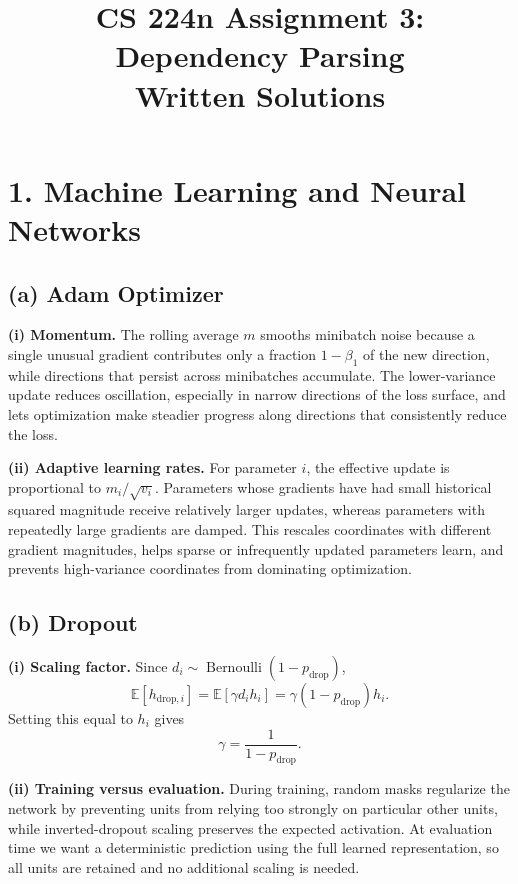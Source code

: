 \documentclass[11pt]{article}
\title{CS 224n Assignment 3: Dependency Parsing\\Written Solutions}
\author{}
\date{}
\begin{document}
\maketitle

\section*{1. Machine Learning and Neural Networks}

\subsection*{(a) Adam Optimizer}

\textbf{(i) Momentum.}
The rolling average $m$ smooths minibatch noise because a single unusual gradient contributes only a fraction $1-\beta_1$ of the new direction, while directions that persist across minibatches accumulate. The lower-variance update reduces oscillation, especially in narrow directions of the loss surface, and lets optimization make steadier progress along directions that consistently reduce the loss.

\textbf{(ii) Adaptive learning rates.}
For parameter $i$, the effective update is proportional to $m_i/\sqrt{v_i}$. Parameters whose gradients have had small historical squared magnitude receive relatively larger updates, whereas parameters with repeatedly large gradients are damped. This rescales coordinates with different gradient magnitudes, helps sparse or infrequently updated parameters learn, and prevents high-variance coordinates from dominating optimization.

\subsection*{(b) Dropout}

\textbf{(i) Scaling factor.}
Since $d_i\sim\operatorname{Bernoulli}(1-p_{\mathrm{drop}})$,
\[
\mathbb E[h_{\mathrm{drop},i}]
=\mathbb E[\gamma d_i h_i]
=\gamma(1-p_{\mathrm{drop}})h_i.
\]
Setting this equal to $h_i$ gives
\[
\boxed{\gamma=\frac{1}{1-p_{\mathrm{drop}}}.}
\]

\textbf{(ii) Training versus evaluation.}
During training, random masks regularize the network by preventing units from relying too strongly on particular other units, while inverted-dropout scaling preserves the expected activation. At evaluation time we want a deterministic prediction using the full learned representation, so all units are retained and no additional scaling is needed.
\end{document}
